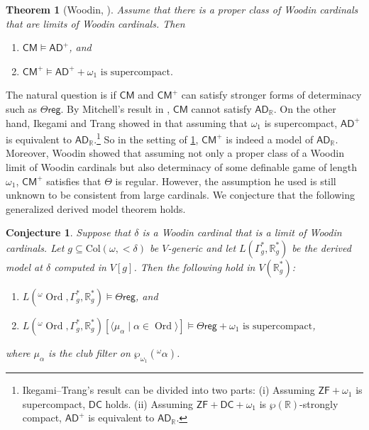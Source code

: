 \documentclass{amsart}
\newtheorem{thm}[dfn]{Theorem}
\newtheorem{conj}[dfn]{Conjecture}
\renewcommand{\subset}{\subseteq}
\newcommand{\power}{\wp}
\DeclareMathOperator{\ord}{Ord}
\begin{document}
\begin{thm}[Woodin, \cite{Wo21}]\label{det_in_Chang}
    Assume that there is a proper class of Woodin cardinals that are limits of Woodin cardinals. Then
    \begin{enumerate}
        \item $\mathsf{CM}\models\mathsf{AD}^+$, and
        \item $\mathsf{CM}^+\models\mathsf{AD}^+ + \omega_1\text{ is supercompact.}$
    \end{enumerate}
\end{thm}

The natural question is if $\mathsf{CM}$ and $\mathsf{CM}^+$ can satisfy stronger forms of determinacy such as $\Theta\mathsf{reg}$.
By Mitchell's result in \cite{Mi17}, $\mathsf{CM}$ cannot satisfy $\mathsf{AD}_{\mathbb{R}}$.
On the other hand, Ikegami and Trang showed in \cite{spct_of_omega_1} that assuming that $\omega_1$ is supercompact, $\mathsf{AD}^+$ is equivalent to $\mathsf{AD}_{\mathbb{R}}$.\footnote{Ikegami--Trang's result can be divided into two parts: (i) Assuming $\mathsf{ZF}+\omega_1$ is supercompact, $\mathsf{DC}$ holds. (ii) Assuming $\mathsf{ZF}+\mathsf{DC}+\omega_1$ is $\wp(\mathbb{R})$-strongly compact, $\mathsf{AD}^+$ is equivalent to $\mathsf{AD}_{\mathbb{R}}$.}
So in the setting of \cref{det_in_Chang}, $\mathsf{CM}^+$ is indeed a model of $\mathsf{AD}_{\mathbb{R}}$.
Moreover, Woodin showed that assuming not only a proper class of a Woodin limit of Woodin cardinals but also determinacy of some definable game of length $\omega_1$, $\mathsf{CM}^+$ satisfies that $\Theta$ is regular.
However, the assumption he used is still unknown to be consistent from large cardinals.
We conjecture that the following generalized derived model theorem holds.

\begin{conj}\label{conj_on_global_ver_of_CDM}
    Suppose that $\delta$ is a Woodin cardinal that is a limit of Woodin cardinals. Let $g\subset\mathrm{Col}(\omega, {<}\delta)$ be $V$-generic and let $L(\Gamma^*_g, \mathbb{R}^*_g)$ be the derived model at $\delta$ computed in $V[g]$. Then the following hold in $V(\mathbb{R}^*_g)$:
    \begin{enumerate}
        \item $L({}^{\omega}\!\ord, \Gamma^*_g, \mathbb{R}^*_g)\models\Theta\mathsf{reg}$, and
        \item $L({}^{\omega}\!\ord, \Gamma^*_g, \mathbb{R}^*_g)[\langle\mu_{\alpha}\mid\alpha\in\ord\rangle]\models\Theta\mathsf{reg}+ \omega_1\text{ is supercompact}$,
    \end{enumerate}
    where $\mu_{\alpha}$ is the club filter on $\power_{\omega_1}({}^{\omega}\alpha)$.
\end{conj}
\end{document}
